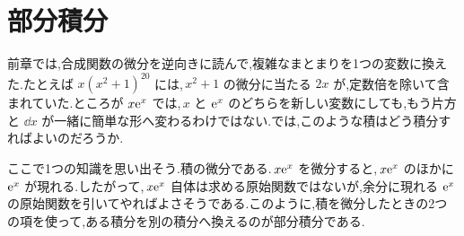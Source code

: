 \chapter{部分積分}\label{章:部分積分}

前章では,合成関数の微分を逆向きに読んで,複雑なまとまりを1つの変数に換えた.たとえば $x(x^2+1)^{20}$ には,\,$x^2+1$ の微分に当たる $2x$ が,定数倍を除いて含まれていた.ところが $x\mathrm{e}^x$ では,\,$x$ と $\mathrm{e}^x$ のどちらを新しい変数にしても,もう片方と $\dd x$ が一緒に簡単な形へ変わるわけではない.では,このような積はどう積分すればよいのだろうか.

ここで1つの知識を思い出そう.積の微分である.\,$x\mathrm{e}^x$ を微分すると,\,$x\mathrm{e}^x$ のほかに $\mathrm{e}^x$ が現れる.したがって,\,$x\mathrm{e}^x$ 自体は求める原始関数ではないが,余分に現れる $\mathrm{e}^x$ の原始関数を引いてやればよさそうである.このように,積を微分したときの2つの項を使って,ある積分を別の積分へ換えるのが部分積分である.

%
%
%
%
%
%
%
%
%
